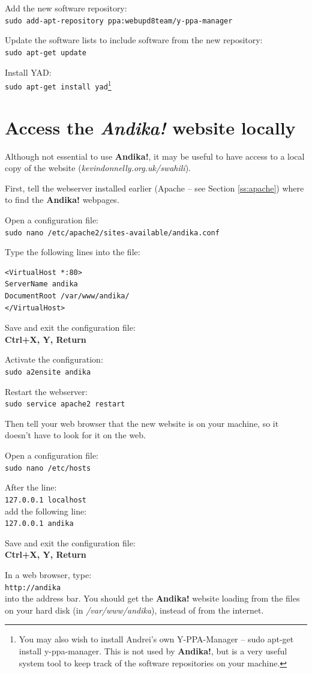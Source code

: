 Add the new software repository:\\
\verb|sudo add-apt-repository ppa:webupd8team/y-ppa-manager|

Update the software lists to include software from the new repository:\\
\verb|sudo apt-get update|

Install YAD:\\
\verb|sudo apt-get install yad|\footnote{You may also wish to install Andrei's own Y-PPA-Manager -- sudo apt-get install y-ppa-manager.  This is not used by \textbf{Andika!}, but is a very useful system tool to keep track of the software repositories on your machine.}


\section{Access the \textit{Andika!} website locally}
\label{s:localaccess}

Although not essential to use \textbf{Andika!}, it may be useful to have access to a local copy of the website (\textit{kevindonnelly.org.uk/swahili}).  

First, tell the webserver installed earlier (Apache -- see Section \ref{ss:apache}) where to find the\textbf{ Andika!} webpages.

Open a configuration file:\\
\verb|sudo nano /etc/apache2/sites-available/andika.conf|

Type the following lines into the file:\\
\vspace{-0.5cm}  %
\begin{verbatim}
<VirtualHost *:80>
ServerName andika
DocumentRoot /var/www/andika/
</VirtualHost>
\end{verbatim}

Save and exit the configuration file:\\
\textbf{Ctrl+X, Y, Return}

Activate the configuration:\\
\verb|sudo a2ensite andika|

Restart the webserver:\\
\verb|sudo service apache2 restart|

Then tell your web browser that the new website is on your machine, so it doesn't have to look for it on the web.

Open a configuration file:\\
\verb|sudo nano /etc/hosts|

After the line:\\
\verb|127.0.0.1	localhost|\\
add the following line:\\
\verb|127.0.0.1	andika|

Save and exit the configuration file:\\
\textbf{Ctrl+X, Y, Return}

In a web browser, type:\\
\verb|http://andika|\\
into the address bar.  You should get the \textbf{Andika!} website loading from the files on your hard disk (in \textit{/var/www/andika}), instead of from the internet.
